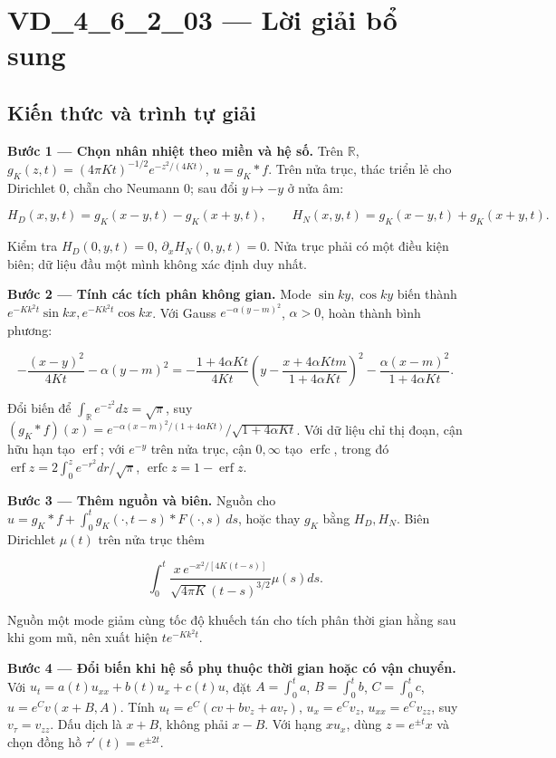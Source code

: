 \documentclass[10pt,a4paper]{article}
\begin{document}
\section*{VD\_4\_6\_2\_03 — Lời giải bổ sung}
\subsection*{Kiến thức và trình tự giải}
\textbf{Bước 1 — Chọn nhân nhiệt theo miền và hệ số.} Trên $\mathbb R$, $g_K(z,t)=(4\pi Kt)^{-1/2}e^{-z^2/(4Kt)}$, $u=g_K*f$. Trên nửa trục, thác triển lẻ cho Dirichlet $0$, chẵn cho Neumann $0$; sau đổi $y\mapsto-y$ ở nửa âm:


\[
H_D(x,y,t)=g_K(x-y,t)-g_K(x+y,t),\qquad
H_N(x,y,t)=g_K(x-y,t)+g_K(x+y,t).
\]


Kiểm tra $H_D(0,y,t)=0$, $\partial_xH_N(0,y,t)=0$. Nửa trục phải có một điều kiện biên; dữ liệu đầu một mình không xác định duy nhất.

\textbf{Bước 2 — Tính các tích phân không gian.} Mode $\sin ky,\cos ky$ biến thành $e^{-Kk^2t}\sin kx,e^{-Kk^2t}\cos kx$. Với Gauss $e^{-\alpha(y-m)^2}$, $\alpha>0$, hoàn thành bình phương:


\[
-\frac{(x-y)^2}{4Kt}-\alpha(y-m)^2
=-\frac{1+4\alpha Kt}{4Kt}\left(y-\frac{x+4\alpha Ktm}{1+4\alpha Kt}\right)^2
-\frac{\alpha(x-m)^2}{1+4\alpha Kt}.
\]


Đổi biến để $\int_{\mathbb R}e^{-z^2}dz=\sqrt\pi$, suy $(g_K*f)(x)=e^{-\alpha(x-m)^2/(1+4\alpha Kt)}/\sqrt{1+4\alpha Kt}$. Với dữ liệu chỉ thị đoạn, cận hữu hạn tạo $\operatorname{erf}$; với $e^{-y}$ trên nửa trục, cận $0,\infty$ tạo $\operatorname{erfc}$, trong đó $\operatorname{erf}z=2\int_0^ze^{-r^2}dr/\sqrt\pi$, $\operatorname{erfc}z=1-\operatorname{erf}z$.

\textbf{Bước 3 — Thêm nguồn và biên.} Nguồn cho $u=g_K*f+\int_0^tg_K(\cdot,t-s)*F(\cdot,s)\,ds$, hoặc thay $g_K$ bằng $H_D,H_N$. Biên Dirichlet $\mu(t)$ trên nửa trục thêm


\[
\int_0^t\frac{x\,e^{-x^2/[4K(t-s)]}}{\sqrt{4\pi K}(t-s)^{3/2}}\mu(s)ds.
\]


Nguồn một mode giảm cùng tốc độ khuếch tán cho tích phân thời gian hằng sau khi gom mũ, nên xuất hiện $te^{-Kk^2t}$.

\textbf{Bước 4 — Đổi biến khi hệ số phụ thuộc thời gian hoặc có vận chuyển.} Với $u_t=a(t)u_{xx}+b(t)u_x+c(t)u$, đặt $A=\int_0^ta$, $B=\int_0^tb$, $C=\int_0^tc$, $u=e^Cv(x+B,A)$. Tính $u_t=e^C(cv+bv_z+av_\tau)$, $u_x=e^Cv_z$, $u_{xx}=e^Cv_{zz}$, suy $v_\tau=v_{zz}$. Dấu dịch là $x+B$, không phải $x-B$. Với hạng $xu_x$, dùng $z=e^{\pm t}x$ và chọn đồng hồ $\tau'(t)=e^{\pm2t}$.
\end{document}
